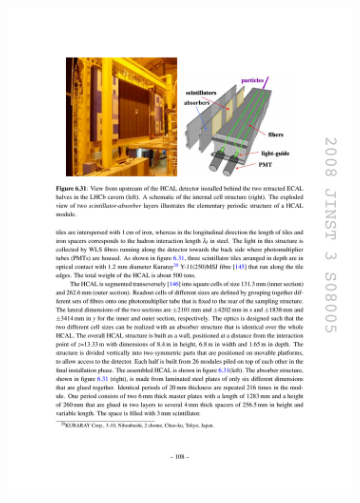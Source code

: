 \begin{figure}[!h]
    \centering
    \begin{subfigure}[m]{0.4\textwidth}
        \centering        
        \includegraphics[width=1.0\textwidth]{figs/Detector/hcal_diagram.pdf}
    \end{subfigure}
    \begin{subfigure}[m]{0.4\textwidth}
        \centering

\end{subfigure}
\end{figure}
